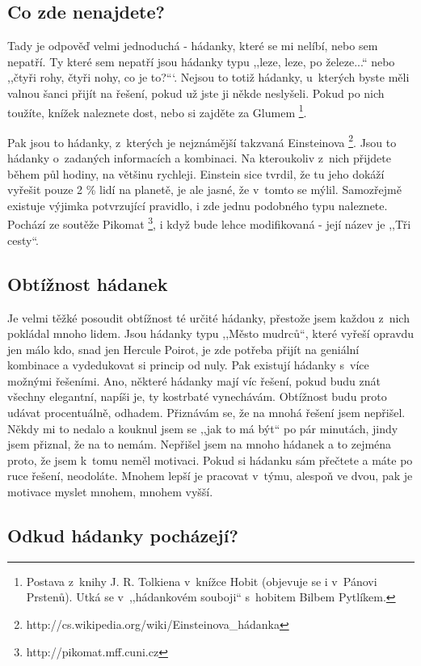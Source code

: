 \documentclass[czech]{book}
\begin{document}
\subsection{Co zde nenajdete?}

Tady je odpověď velmi jednoduchá - hádanky, které se mi nelíbí, nebo
sem nepatří. Ty které sem nepatří jsou hádanky typu ,,leze, leze,
po železe...{}`` nebo ,,čtyři rohy, čtyři nohy, co je to?{}```.
Nejsou to totiž hádanky, u~kterých byste měli valnou šanci přijít
na řešení, pokud už jste ji někde neslyšeli. Pokud po nich toužíte,
knížek naleznete dost, nebo si zajděte za Glumem%
\footnote{Postava z~knihy J. R. Tolkiena v~knížce Hobit (objevuje se i v~Pánovi
Prstenů). Utká se v~,,hádankovém souboji{}`` s~hobitem Bilbem Pytlíkem.%
}.

Pak jsou to hádanky, z~kterých je nejznámější takzvaná Einsteinova%
\footnote{http://cs.wikipedia.org/wiki/Einsteinova\_hádanka%
}. Jsou to hádanky o~zadaných informacích a kombinaci. Na kteroukoliv
z~nich přijdete během půl hodiny, na většinu rychleji. Einstein sice
tvrdil, že tu jeho dokáží vyřešit pouze 2 \% lidí na planetě, je ale
jasné, že v~tomto se mýlil. Samozřejmě existuje výjimka potvrzující
pravidlo, i zde jednu podobného typu naleznete. Pochází ze soutěže Pikomat%
\footnote{http://pikomat.mff.cuni.cz}, i když bude lehce modifikovaná -
její název je ,,Tři cesty``.


\subsection{Obtížnost hádanek}

Je velmi těžké posoudit obtížnost té určité hádanky, přestože jsem
každou z~nich pokládal mnoho lidem. Jsou hádanky typu ,,Město mudrců{}``,
které vyřeší opravdu jen málo kdo, snad jen Hercule Poirot, je zde
potřeba přijít na geniální kombinace a vydedukovat si princip od nuly.
Pak existují hádanky s~více možnými řešeními. Ano, některé hádanky
mají víc řešení, pokud budu znát všechny elegantní, napíši je, ty
kostrbaté vynechávám. Obtížnost budu proto udávat procentuálně, odhadem.
Přiznávám se, že na mnohá řešení jsem nepřišel. Někdy mi to nedalo
a kouknul jsem se ,,jak to má být{}`` po pár minutách, jindy jsem
přiznal, že na to nemám. Nepřišel jsem na mnoho hádanek a to zejména
proto, že jsem k~tomu neměl motivaci. Pokud si hádanku sám přečtete
a máte po ruce řešení, neodoláte. Mnohem lepší je pracovat v~týmu,
alespoň ve dvou, pak je motivace myslet mnohem, mnohem vyšší.


\subsection{Odkud hádanky pocházejí?}
\end{document}
